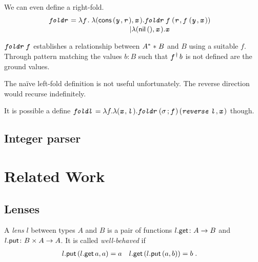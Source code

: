 \documentclass[runningheads,envcountsame]{llncs}
\begin{document}
    We can even define a right-fold.
    \begin{align*}
        \stackMath\evar{foldr} &= \elam{\evar{f}}{\stackunder{
            \phantom{\eorelse} \elam{\epair{\eapp{\econs}{\epair{\evar{y}}{\evar{r}}}}{\evar{x}}}{\eapp{\eapp{\evar{foldr}}{\evar{f}}}{\epair{\evar{r}}{\eapp{\evar{f}}{\epair{\evar{y}}{\evar{x}}}}}}}{
            \eorelse           \elam{\epair{\eapp{\enil}{\eunit}}{\evar{x}}}{\evar{x}}}
            }
    \end{align*}
    
    $\texttt{\textit{foldr}}\,\texttt{\textit{f}}$ establishes a relationship between ${A}^{*} \mathrel{*} B$ and $B$ using a suitable $f$. Through pattern matching the values $b\colon B$ such that $\eapp{\rev{\evar{f}}}{b}$ is not defined are the ground values.
    
    The na\"{i}ve left-fold definition is not useful unfortunately. The reverse direction would recurse indefinitely.
    
    It is possible a define $\evar{foldl} = \elam{f}{\elam{\epair{\evar{x}}{\evar{l}}}{\eapp{\eapp{\evar{foldr}}{(\comp{\swap}{\evar{f}})}}{\epair{\eapp{\evar{reverse}}{\evar{l}}}{\evar{x}}}}}$ though.
    \subsection{Integer parser}
    
    \section{Related Work}
    
    \subsection{Lenses}
    
    \begin{definition}
        A \emph{lens} $l$ between types $A$ and $B$ is a pair of functions ${l}.\mathsf{get}\colon A \to B$ and ${l}.\mathsf{put}\colon B \times A \to A$. It is called \emph{well-behaved} if \begin{align*}
            {l}.\mathsf{put}\,({l}.\mathsf{get}\,a, a) &= a &
            {l}.\mathsf{get}\,({l}.\mathsf{put}\,(a, b)) &= b\;.
        \end{align*}
    \end{definition}
    
\end{document}
